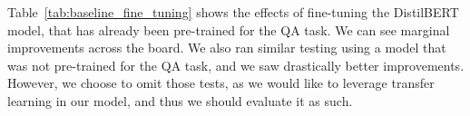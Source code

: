 \documentclass[fleqn,moreauthors,10pt]{ds_report}
\begin{document}
Table~\ref{tab:baseline_fine_tuning} shows the effects of fine-tuning the DistilBERT model, that has already been pre-trained for the QA task. We can see marginal improvements across the board. We also ran similar testing using a model that was not pre-trained for the QA task, and we saw drastically better improvements. However, we choose to omit those tests, as we would like to leverage transfer learning in our model, and thus we should evaluate it as such.





\end{document}
